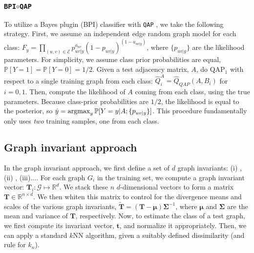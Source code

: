 \documentclass{article} %
\newcommand{\argmax}{\operatornamewithlimits{argmax}}
\newcommand{\PP}{\mathbb{P}}           %
\providecommand{\mc}[1]{\mathcal{#1}}
\providecommand{\mb}[1]{\boldsymbol{#1}}
\providecommand{\mh}[1]{\hat{#1}}
\providecommand{\mtb}[1]{\widetilde{\boldsymbol{#1}}}
\newcommand{\Real}{\mathbb{R}}
\newcommand{\qap}{\texttt{QAP} }
\begin{document}


\subsubsection{\texttt{BPI}$\circ$\qap} %
\label{ssub:bayes_plugin_circ_qap}


To utilize a Bayes plugin (BPI) classifier with \qap, we take the following strategy.  First, we assume an independent edge random graph model for each class: $F_y=\prod_{(u,v) \in \mc{E}}p_{uv|y}^{a_{uv}} (1-p_{uv|y})^{(1-a_{uv|y})}$, where $\{p_{uv|y}\}$ are the likelihood parameters.  For simplicity, we assume class prior probabilities are equal, $\PP[Y=1]=\PP[Y=0]=1/2$.  Given a test adjacency matrix, $A$,  do QAP$_1$ with respect to a single training graph from each class: $\mh{Q}_i^A=\mh{Q}_{QAP}(A,B_i)$ for $i=0,1$.  Then, compute the likelihood of $A$ coming from each class, using the true parameters.  Because class-prior probabilities are $1/2$, the likelihood is equal to the posterior, so $\mh{y}=\argmax_y \PP[Y=y | A; \{p_{uv|y}\}]$. This procedure fundamentally only uses \emph{two} training samples, one from each class. 



\subsection{Graph invariant approach} %
\label{sub:graph_invariant_approach}

In the graph invariant approach, we first define a set of $d$ graph invariants: (i) , (ii) , (iii)....  For each graph $G_i$ in the training set, we compute a graph invariant vector: $\mb{T}_i: \mc{G} \mapsto \Real^d$.  We stack these $n$ $d$-dimensional vectors to form a matrix $\mb{T} \in \Real^{n \times d}$. We then whiten this matrix to control for the divergence means and scales of the various graph invariants, $\mtb{T}=(\mb{T}-\mb{\mu}) \mb{\Sigma}^{-1}$, where $\mb{\mu}$ and $\mb{\Sigma}$ are the mean and variance of $\mb{T}$, respectively.  Now, to estimate the class of a test graph, we first compute its invariant vector, $\mb{t}$, and normalize it appropriately.  Then, we can apply a standard $k$NN algorithm, given a suitably defined dissimilarity (and rule for $k_n$).


\end{document}
